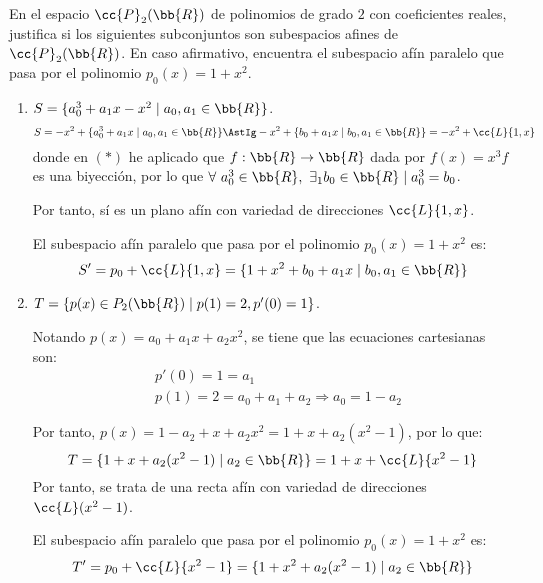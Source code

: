 \begin{ejercicio}
    En el espacio $\cc{P}_2(\bb{R})$ de polinomios de grado $2$ con coeficientes reales,     justifica si los siguientes subconjuntos son subespacios afines de $\cc{P}_2(\bb{R})$. En caso afirmativo, encuentra el subespacio afín paralelo que pasa por el polinomio $p_0(x) = 1 + x^2$.
    \begin{enumerate}
        \item $S = \{a_0^3 + a_1x - x^2 \mid a_0,a_1 \in \bb{R}\}$.
        \begin{equation*}
            S = - x^2 + \{a_0^3 + a_1x \mid a_0,a_1 \in \bb{R}\} \AstIg - x^2 + \{b_0 + a_1x \mid b_0,a_1 \in \bb{R}\} = -x^2 + \cc{L}\{1,x\}
        \end{equation*}
        donde en $(\ast)$ he aplicado que $f:\bb{R}\to \bb{R}$ dada por $f(x)=x^3f$ es una biyección, por lo que $\forall~a_0^3\in \bb{R},~\exists_1 b_0\in \bb{R}\mid a_0^3=b_0$.
        
        Por tanto, sí es un plano afín con variedad de direcciones $\cc{L}\{1,x\}$.

        El subespacio afín paralelo que pasa por el polinomio $p_0(x) = 1 + x^2$ es:
        $$S'=p_0 + \cc{L}\{1,x\} = \{1+x^2+b_0 + a_1x\mid b_0,a_1\in \bb{R}\}$$
        
        \item $T = \{p(x) \in P_2(\bb{R}) \mid p(1) = 2, p'(0) = 1\}$.

        Notando $p(x)=a_0+a_1x+a_2x^2$, se tiene que las ecuaciones cartesianas son:
        \begin{align*}
            &p'(0)= 1=a_1\\
            &p(1)=2=a_0+a_1+a_2 \Longrightarrow a_0=1-a_2
        \end{align*}

        Por tanto, $p(x)=1-a_2 + x+a_2x^2=1+x + a_2(x^2-1)$, por lo que:
        $$T=\{1+x+a_2(x^2-1)\mid a_2\in \bb{R}\} = 1+x+\cc{L}\{x^2-1\}$$
        Por tanto, se trata de una recta afín con variedad de direcciones $\cc{L}(x^2-1)$.

        El subespacio afín paralelo que pasa por el polinomio $p_0(x) = 1 + x^2$ es:
        $$T'=p_0 + \cc{L}\{x^2-1\} = \{1+x^2+a_2(x^2-1)\mid a_2\in \bb{R}\}$$
    \end{enumerate}
\end{ejercicio}



